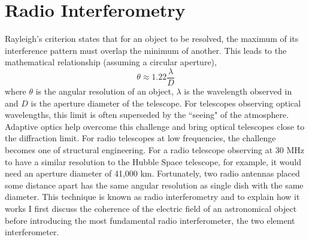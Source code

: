 %
%

\section{Radio Interferometry}
\label{sec:interferometry}
Rayleigh's criterion states that for an object to be resolved, the maximum of its interference pattern must overlap the minimum of another. This leads to the mathematical relationship (assuming a circular aperture), 
$$\theta \approx 1.22 \frac{\lambda}{D}$$ 
where $\theta$ is the angular resolution of an object, $\lambda$ is the wavelength observed in and $D$ is the aperture diameter of the telescope. For telescopes observing optical wavelengths, this limit is often superseded by the ``seeing" of the atmosphere. Adaptive optics help overcome this challenge and bring optical telescopes close to the diffraction limit. For radio telescopes at low frequencies, the challenge becomes one of structural engineering. For a radio telescope observing at 30 MHz to have a similar resolution to the Hubble Space telescope, for example, it would need an aperture diameter of 41,000 km. Fortunately, two radio antennas placed some distance apart has the same angular resolution as single dish with the same diameter. This technique is known as radio interferometry and to explain how it works I first discuss the coherence of the electric field of an astronomical object before introducing the most fundamental radio interferometer, the two element interferometer.


